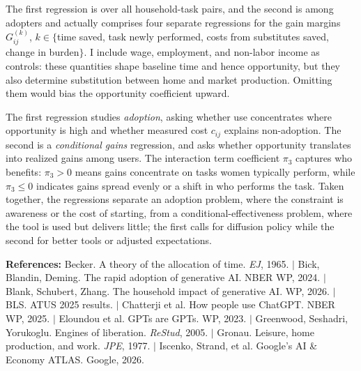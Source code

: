 \documentclass[11pt]{article}
\begin{document}
The first regression is over all household-task pairs, and the second is among adopters and actually comprises four separate regressions for the gain margins $G^{(k)}_{ij}$, $k \in \{$time saved, task newly performed, costs from substitutes saved, change in burden$\}$. I include wage, employment, and non-labor income as controls: these quantities shape baseline time and hence opportunity, but they also determine substitution between home and market production. Omitting them would bias the opportunity coefficient upward. 

The first regression studies \emph{adoption}, asking whether use concentrates where opportunity is high and whether measured cost $c_{ij}$ explains non-adoption. The second is a \emph{conditional gains} regression, and asks whether opportunity translates into realized gains among users. The interaction term coefficient $\pi_3$ captures who benefits: $\pi_3 > 0$ means gains concentrate on tasks women typically perform, while $\pi_3 \leq 0$ indicates gains spread evenly or a shift in who performs the task. Taken together, the regressions separate an adoption problem, where the constraint is awareness or the cost of starting, from a conditional-effectiveness problem, where the tool is used but delivers little; the first calls for diffusion policy while the second for better tools or adjusted expectations. %


\smallskip
\noindent\textbf{References:} Becker. A theory of the allocation of time. \emph{EJ}, 1965. $|$ Bick, Blandin, Deming. The rapid adoption of generative AI. NBER WP, 2024. $|$ Blank, Schubert, Zhang. The household impact of generative AI. WP, 2026. $|$ BLS. ATUS 2025 results. $|$ Chatterji et al. How people use ChatGPT. NBER WP, 2025. $|$ Eloundou et al. GPTs are GPTs. WP, 2023. $|$ Greenwood, Seshadri, Yorukoglu. Engines of liberation. \emph{ReStud}, 2005. $|$ Gronau. Leisure, home production, and work. \emph{JPE}, 1977. $|$ Iscenko, Strand, et al. Google's AI \& Economy ATLAS. Google, 2026.
\end{document}
